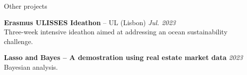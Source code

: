 \documentclass{resume} %
\begin{document}

\begin{rSection}{Other projects}



{\bf Erasmus ULISSES Ideathon} -- UL (Lisbon) \hfill  {\em Jul. 2023} \\
Three-week intensive ideathon aimed at addressing an ocean sustainability challenge.

{\bf Lasso and Bayes -- A demostration using real estate market data} \hfill {\em 2023} 
\\ Bayesian analysis. \\


\end{rSection}
\end{document}
